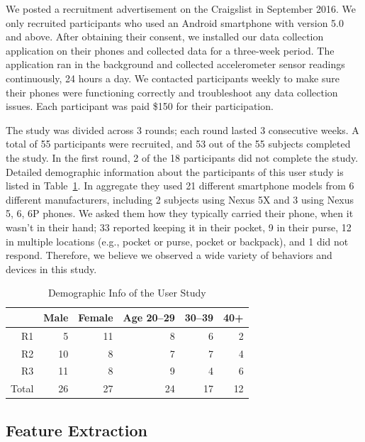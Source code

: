 We posted a recruitment advertisement on the Craigslist in September 2016. 
We only recruited participants who used an Android smartphone with version 5.0 and above.
After obtaining their consent, we installed our data collection application on their phones and collected data for a three-week period.
The application ran in the background and collected accelerometer sensor readings continuously, 24 hours a day.
We contacted participants weekly to make sure their phones were functioning correctly and troubleshoot any data collection issues.
Each participant was paid \$150 for their participation.

The study was divided across 3 rounds; each round lasted 3 consecutive weeks. 
A total of 55 participants were recruited, and
53 out of the 55 subjects completed the study. 
In the first round, 2 of the 18 participants did not complete the study.
Detailed demographic information about the participants of this user study is listed in Table~\ref{tbl:demographics}.
In aggregate they used 21 different smartphone models from 6 different manufacturers, including 2 subjects using Nexus 5X and 3 using Nexus 5, 6, 6P phones.
We asked them how they typically carried their phone, when it wasn't in their hand; 33 reported keeping it in their pocket, 9 in their purse, 12 in multiple locations (e.g., pocket or purse, pocket or backpack), and 1 did not respond.
Therefore, we believe we observed a wide variety of behaviors and devices in this study.

\begin{table}[H]
\centering
\begin{tabular}{rrrrrr}
\hline
      & Male & Female & Age 20--29 & 30--39 & 40+ \\ \hline
R1    & 5    & 11     & 8         & 6     & 2   \\
R2    & 10   & 8      & 7         & 7     & 4   \\
R3    & 11   & 8      & 9         & 4     & 6   \\
Total & 26   & 27     & 24        & 17    & 12  \\ \hline
\end{tabular}
\caption{Demographic Info of the User Study}
\label{tbl:demographics}
\end{table}




\subsection{Feature Extraction}
\label{s:features}

